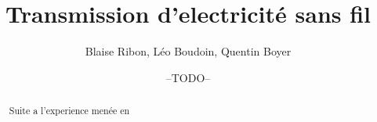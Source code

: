 \documentclass[12pt]{report}
\begin{document}
\title{Transmission d'electricité sans fil}
\author{Blaise Ribon, Léo Boudoin, Quentin Boyer}
\date{--TODO--}
\maketitle
\begin{abstract}
	Suite a l'experience menée en 
\end{abstract}
\end{document}

